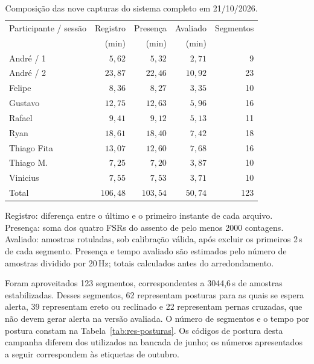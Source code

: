 \begin{table}[H]
  \centering
  \caption{Composição das nove capturas do sistema completo em 21/10/2026.}
  \label{tab:res-capturas}
  \begin{singlespace}
  \small
  \begin{tabularx}{\linewidth}{Xrrrr}
    \toprule
    Participante / sessão & Registro & Presença & Avaliado & Segmentos \\
                          & (min) & (min) & (min) & \\
    \midrule
    André / 1       & $5{,}62$  & $5{,}32$  & $2{,}71$  & 9 \\
    André / 2       & $23{,}87$ & $22{,}46$ & $10{,}92$ & 23 \\
    Felipe          & $8{,}36$  & $8{,}27$  & $3{,}35$  & 10 \\
    Gustavo         & $12{,}75$ & $12{,}63$ & $5{,}96$  & 16 \\
    Rafael          & $9{,}41$  & $9{,}12$  & $5{,}13$  & 11 \\
    Ryan            & $18{,}61$ & $18{,}40$ & $7{,}42$  & 18 \\
    Thiago Fita     & $13{,}07$ & $12{,}60$ & $7{,}68$  & 16 \\
    Thiago M.       & $7{,}25$  & $7{,}20$  & $3{,}87$  & 10 \\
    Vinicius        & $7{,}55$  & $7{,}53$  & $3{,}71$  & 10 \\
    \midrule
    Total           & $106{,}48$ & $103{,}54$ & $50{,}74$ & 123 \\
    \bottomrule
  \end{tabularx}
  \end{singlespace}
  \par\smallskip
  {\footnotesize Registro: diferença entre o último e o primeiro instante de
  cada arquivo. Presença: soma dos quatro FSRs do assento de pelo menos 2000
  contagens. Avaliado: amostras rotuladas, sob calibração válida, após excluir
  os primeiros 2\,s de cada segmento. Presença e tempo avaliado são estimados
  pelo número de amostras dividido por 20\,Hz; totais calculados antes do
  arredondamento.}
\end{table}

Foram aproveitados 123 segmentos, correspondentes a 3044{,}6\,s de
amostras estabilizadas. Desses segmentos, 62 representam posturas para as
quais se espera alerta, 39 representam ereto ou reclinado e 22 representam
pernas cruzadas, que não devem gerar alerta na versão avaliada. O número de
segmentos e o tempo por postura constam na Tabela~\ref{tab:res-posturas}.
Os códigos de postura desta campanha diferem dos utilizados na bancada de
junho; os números apresentados a seguir correspondem às etiquetas de outubro.

